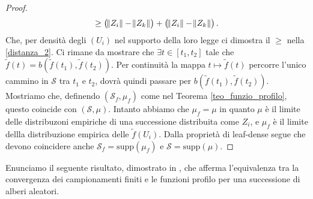 \documentclass[11pt, twoside]{report}
\newcommand{\Ss}{\mathscr{S}}
\newcommand{\Rr}{\mathscr{R}}
\newcommand{\Tt}{\mathscr{T}}
\theoremstyle{definition}
\theoremstyle{plain}
\newtheorem{teo}{Teorema}[chapter]
\newtheorem{prop}[teo]{Proposizione}
\theoremstyle{remark}
\numberwithin{equation}{chapter}
\begin{document}
\begin{proof}
\begin{gather}
\geq \left(\norm{Z_i}-\norm{Z_k}\right) + \left(\norm{Z_i}-\norm{Z_k}\right). \nonumber
\end{gather}
Che, per densità degli $(U_i)$ nel supporto della loro legge ci dimostra il $\geq$ nella \eqref{distanza_2}. Ci rimane da mostrare che $\exists t\in [t_1,t_2]$ tale che $\tilde{f}(t)=b(\tilde{f}(t_1), \tilde{f}(t_2))$. Per continuità la mappa $t\longmapsto \tilde{f}(t)$ percorre l'unico cammino in $\Ss$ tra $t_1$ e $t_2$, dovrà quindi passare per $b(\tilde{f}(t_1), \tilde{f}(t_2))$. Mostriamo che, definendo $(\Ss_f, \mu_f)$ come nel Teorema \ref{teo_funzio_profilo}, questo coincide con $(\Ss,\mu)$. Intanto abbiamo che $\mu_f=\mu$ in quanto $\mu$ è il limite delle distribuzoni empiriche di una successione distribuita come $Z_i$, e $\mu_f$ è il limite dellla distribuzione empirica delle $\tilde{f}(U_i)$. Dalla proprietà di leaf-dense segue che devono coincidere anche $\Ss_f=\mathrm{supp}(\mu_f)$ e $\Ss=\mathrm{supp}(\mu)$.

\end{proof}
\begin{comment}
In quanto segue consideriamo una successione di alberi\footnote{nel senso della Definizione \ref{def_albero}.} aleatori $\Tt_n$ e per ogni $n$ un riordinamento aleatorio uniforme $\left(V_{n,1}, \, \dots \, ,V_{n,n}\right)$ dei vertici di $\Tt_n$.

\begin{teo}\label{teo_conv_measure_repre}
Supponiamo che per ogni $k\in \mathbb{N} \quad r\left(\Tt_n, \left\{V_{n,1}, \, \dots \, ,V_{n,k}\right\}\right)\xrightarrow{d}\Rr(k)$ dove $(\Rr(k))$ è una famiglia di $k$-alberi propri. Allora $(\Rr(k))$ è automaticamente consistente, supponiamo che sia anche leaf-tight. Sia $(\Ss, \mu)$ il CRT rappresentante $(\Rr(k))$, allora per ogni $n$ esiste una rappresentazione in misura $\mu_n$ di $\Tt_n$ tale che $\mu_n \xrightarrow{d}\mu$.
\end{teo}

\begin{prop}{\textbf{(Porposizione misteriosa->corollario 19 articolo)}}
Utilizziamo le stesse ipotesi e notazione del teorema \ref{teo_conv_measure_repre} e definiamo
$$\Delta(n,k)=\max\limits_{v\in\Tt_n} \ \min\limits_{w\in r\left(\Tt_n, V_{n,1}, \, \dots \, ,V_{n,k}\right)} d(v,w).$$
Se vale
\begin{equation} \label{eq_delta}
\lim\limits_k \limsup_n P(\Delta(n,k)>\epsilon)=0, \quad \forall \epsilon>0
\end{equation}
allora $\Ss_n\xrightarrow{d}\Ss$\footnote{Dove si intende la convergenza in distribuzione sullo spazio dei chiusi di $l_1$ con la metrica di Housedorff.}.
\end{prop}
\end{comment}
Enunciamo il seguente risultato, dimostrato in \cite{Ald3}, che afferma l'equivalenza tra la convergenza dei campionamenti finiti e le funzioni profilo per una successione di alberi aleatori.
\end{document}
